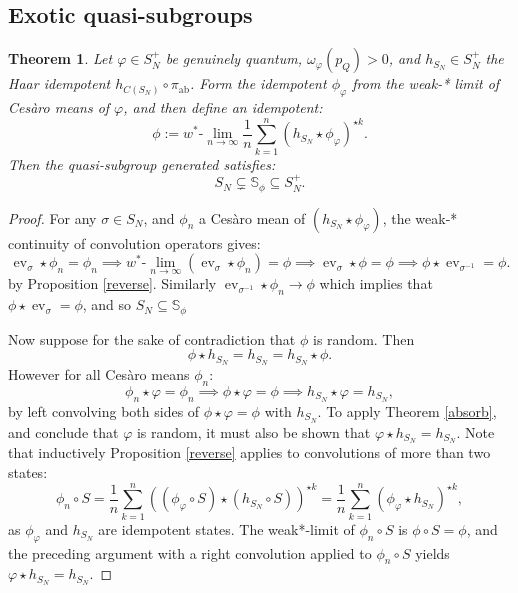 \documentclass[12pt]{amsart}
\newtheorem{theorem}{Theorem}[section]
\theoremstyle{remark}
\theoremstyle{remark}
\begin{document}
\subsection{Exotic quasi-subgroups}
\begin{theorem}\label{idemtotty}
Let $\varphi\in S_N^+$ be genuinely quantum, $\omega_{\varphi}(p_Q)>0$, and $h_{S_N}\in S_N^+$ the Haar idempotent $h_{C(S_N)}\circ \pi_{\text{ab}}$. Form the idempotent $\phi_\varphi$ from the weak-* limit of Ces\`{a}ro means of $\varphi$, and then define an idempotent:
\begin{equation}\phi:=w^*\text{-}\lim_{n\to\infty}\frac{1}{n}\sum_{k=1}^n(h_{S_N}\star \phi_\varphi)^{\star k}.\label{idempot}\end{equation}
Then the quasi-subgroup generated satisfies:
 $$S_N\subsetneq \mathbb{S}_{\phi}\subseteq S_N^+.$$
 \end{theorem}
 \begin{proof}
For any $\sigma\in S_N$, and $\phi_n$ a Ces\`{a}ro mean of $(h_{S_N}\star \phi_\varphi)$, the weak-* continuity of convolution operators gives:
$$\operatorname{ev}_\sigma\star \phi_n=\phi_n\implies w^*\text{-}\lim_{n\to\infty}(\operatorname{ev}_\sigma\star\phi_n)=\phi\implies \operatorname{ev}_\sigma\star \phi=\phi\implies \phi\star\operatorname{ev}_{\sigma^{-1}}=\phi.$$
by Proposition \ref{reverse}. Similarly $\operatorname{ev}_{\sigma^{-1}}\star \phi_n\to \phi$ which implies that $\phi\star\operatorname{ev}_{\sigma}=\phi$, and so $S_N\subseteq \mathbb{S}_{\phi}$

\bigskip

Now suppose for the sake of contradiction that $\phi$ is random. Then
$$\phi\star h_{S_N}=h_{S_N}=h_{S_N}\star \phi.$$
However for all Ces\`{a}ro means $\phi_n$:
$$\phi_n\star \varphi=\phi_n\implies \phi\star \varphi=\phi\implies h_{S_N}\star \varphi=h_{S_N},$$
by left convolving both sides of  $ \phi\star \varphi=\phi$ with $h_{S_N}$. To apply Theorem \ref{absorb}, and conclude that $\varphi$ is random, it must also be shown that $\varphi\star h_{S_N}=h_{S_N}$. Note that inductively Proposition \ref{reverse} applies to convolutions of more than two states:
$$\phi_n\circ S=\frac{1}{n}\sum_{k=1}^n((\phi_\varphi\circ S)\star (h_{S_N}\circ S) )^{\star k}=\frac{1}{n}\sum_{k=1}^n(\phi_\varphi\star h_{S_N})^{\star k},$$
as $\phi_\varphi$ and $h_{S_N}$ are idempotent states. The weak*-limit of $\phi_n\circ S$ is $\phi\circ S=\phi$, and the preceding argument with a right convolution applied to $\phi_n\circ S$ yields  $\varphi\star h_{S_N}=h_{S_N}$.
 \end{proof}
\end{document}
